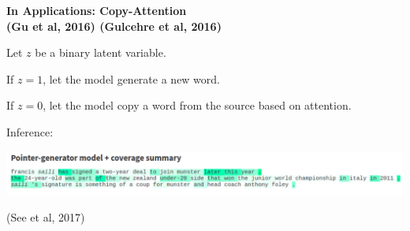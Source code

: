 \documentclass[aspectratio=169]{beamer}
\let\tempone\itemize
\let\temptwo\enditemize
\renewenvironment{itemize}{\tempone\addtolength{\itemsep}{0.5\baselineskip}}{\temptwo}
\newcommand{\air}{\vspace{0.25cm}}
\begin{document}
\begin{frame}
  \begin{center}
    \textbf{ In Applications: Copy-Attention \\
      \small{(Gu et al, 2016) (Gulcehre et al, 2016)}}
  \end{center}

Let $z$ be a binary latent variable.
\air
\begin{itemize}
\item If $z = 1$, let the model generate a new word.
\item If $z = 0$, let the model copy a word from the source based on attention.
\end{itemize}

Inference:
\begin{center}


\includegraphics[width=15cm]{seeblog}

\centerline{\small (See et al, 2017)}
\end{center}
\end{frame}




\end{document}
